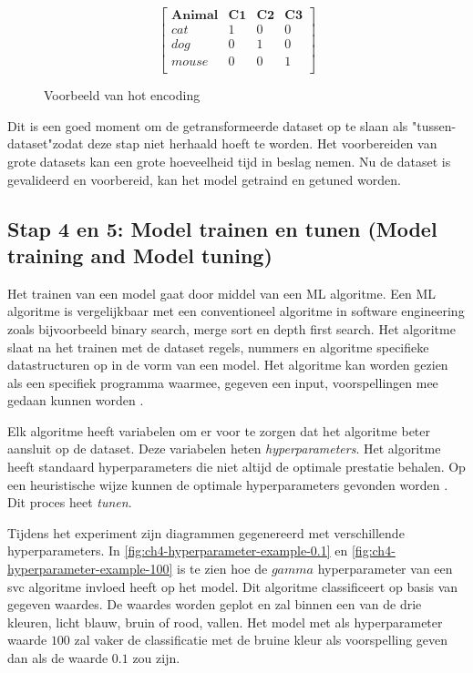 \begin{figure}[hbt!]
  \centering
  $$\begin{bmatrix}
    \textbf{Animal} & \textbf{C1} & \textbf{C2} & \textbf{C3}\\
    cat & 1 & 0 & 0 \\
    dog & 0 & 1 & 0 \\
    mouse & 0 & 0 & 1 \\
  \end{bmatrix}$$
  \label{fig:ch4-hot-encoding-example}
  \caption{Voorbeeld van hot encoding}
\end{figure}

Dit is een goed moment om de getransformeerde dataset op te slaan als "tussen-dataset"\space zodat deze stap niet herhaald hoeft te worden. Het voorbereiden van grote datasets kan een grote hoeveelheid tijd in beslag nemen. Nu de dataset is gevalideerd en voorbereid, kan het model getraind en getuned worden.

\subsection{Stap 4 en 5: Model trainen en tunen (Model training and Model tuning)}\label{subsec:ch4-model-trainen-en-tunen}
Het trainen van een model gaat door middel van een ML algoritme. Een ML algoritme is vergelijkbaar met een conventioneel algoritme in software engineering zoals bijvoorbeeld binary search, merge sort en depth first search. Het algoritme slaat na het trainen met de dataset regels, nummers en algoritme specifieke datastructuren op in de vorm van een model. Het algoritme kan worden gezien als een specifiek programma waarmee, gegeven een input, voorspellingen mee gedaan kunnen worden \cite{ml-algorithm-model-difference}.

Elk algoritme heeft variabelen om er voor te zorgen dat het algoritme beter aansluit op de dataset. Deze variabelen heten \textit{hyperparameters}. Het algoritme heeft standaard hyperparameters die niet altijd de optimale prestatie behalen. Op een heuristische wijze kunnen de optimale hyperparameters gevonden worden \cite{ml-model-hyper-parameter-brownlee}. Dit proces heet \textit{tunen}.

Tijdens het experiment zijn diagrammen gegenereerd met verschillende hyperparameters. In \autoref{fig:ch4-hyperparameter-example-0.1} en \autoref{fig:ch4-hyperparameter-example-100} is te zien hoe de \(gamma\) hyperparameter van een \acrfull{svc} algoritme invloed heeft op het model. Dit algoritme classificeert op basis van gegeven waardes. De waardes worden geplot en zal binnen een van de drie kleuren, licht blauw, bruin of rood, vallen. Het model met als hyperparameter waarde \(100\) zal vaker de classificatie met de bruine kleur als voorspelling geven dan als de waarde \(0.1\) zou zijn.

